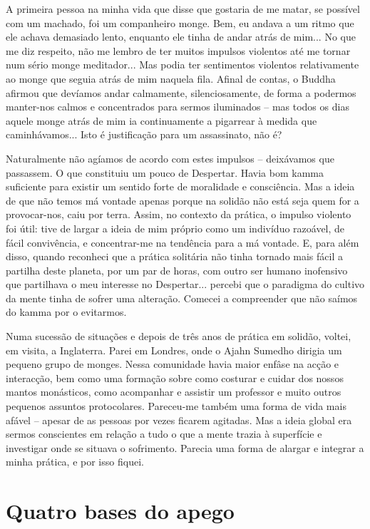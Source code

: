 A primeira pessoa na minha vida que disse que gostaria de me matar, se possível com um machado, foi um companheiro monge. Bem, eu andava a um ritmo que ele achava demasiado lento, enquanto ele tinha de andar atrás de mim... No que me diz respeito, não me lembro de ter muitos impulsos violentos até me tornar num sério monge meditador... Mas podia ter sentimentos violentos relativamente ao monge que seguia atrás de mim naquela fila. Afinal de contas, o Buddha afirmou que devíamos andar calmamente, silenciosamente, de forma a podermos manter-nos calmos e concentrados para sermos iluminados -- mas todos os dias aquele monge atrás de mim ia continuamente a pigarrear à medida que caminhávamos... Isto é justificação para um assassinato, não é?

Naturalmente não agíamos de acordo com estes impulsos -- deixávamos que passassem. O que constituiu um pouco de Despertar. Havia bom kamma suficiente para existir um sentido forte de moralidade e consciência. Mas a ideia de que não temos má vontade apenas porque na solidão não está seja quem for a provocar-nos, caiu por terra. Assim, no contexto da prática, o impulso violento foi útil: tive de largar a ideia de mim próprio como um indivíduo razoável, de fácil convivência, e concentrar-me na tendência para a má vontade. E, para além disso, quando reconheci que a prática solitária não tinha tornado mais fácil a partilha deste planeta, por um par de horas, com outro ser humano inofensivo que partilhava o meu interesse no Despertar... percebi que o paradigma do cultivo da mente tinha de sofrer uma alteração. Comecei a compreender que não saímos do kamma por o evitarmos.

Numa sucessão de situações e depois de três anos de prática em solidão, voltei, em visita, a Inglaterra. Parei em Londres, onde o Ajahn Sumedho dirigia um pequeno grupo de monges. Nessa comunidade havia maior enfâse na acção e interacção, bem como uma formação sobre como costurar e cuidar dos nossos mantos monásticos, como acompanhar e assistir um professor e muito outros pequenos assuntos protocolares. Pareceu-me também uma forma de vida mais afável -- apesar de as pessoas por vezes ficarem agitadas. Mas a ideia global era sermos conscientes em relação a tudo o que a mente trazia à superfície e investigar onde se situava o sofrimento. Parecia uma forma de alargar e integrar a minha prática, e por isso fiquei.

\section{Quatro bases do apego}

